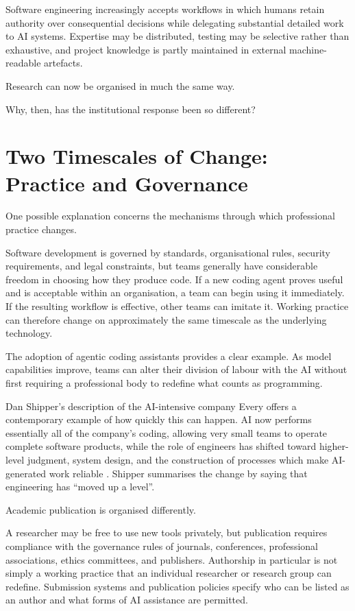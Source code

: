 \documentclass[12pt]{article}
\begin{document}
Software engineering increasingly accepts workflows in which humans retain authority over consequential decisions while delegating substantial detailed work to AI systems. Expertise may be distributed, testing may be selective rather than exhaustive, and project knowledge is partly maintained in external machine-readable artefacts.

Research can now be organised in much the same way.

Why, then, has the institutional response been so different?


\section{Two Timescales of Change: Practice and Governance}

One possible explanation concerns the mechanisms through which professional practice changes.

Software development is governed by standards, organisational rules, security requirements, and legal constraints, but teams generally have considerable freedom in choosing how they produce code. If a new coding agent proves useful and is acceptable within an organisation, a team can begin using it immediately. If the resulting workflow is effective, other teams can imitate it. Working practice can therefore change on approximately the same timescale as the underlying technology.

The adoption of agentic coding assistants provides a clear example. As model capabilities improve, teams can alter their division of labour with the AI without first requiring a professional body to redefine what counts as programming.

Dan Shipper's description of the AI-intensive company Every offers a contemporary example of how quickly this can happen. AI now performs essentially all of the company's coding, allowing very small teams to operate complete software products, while the role of engineers has shifted toward higher-level judgment, system design, and the construction of processes which make AI-generated work reliable \citep{newton2026editorclone}. Shipper summarises the change by saying that engineering has ``moved up a level''.

Academic publication is organised differently.

A researcher may be free to use new tools privately, but publication requires compliance with the governance rules of journals, conferences, professional associations, ethics committees, and publishers. Authorship in particular is not simply a working practice that an individual researcher or research group can redefine. Submission systems and publication policies specify who can be listed as an author and what forms of AI assistance are permitted.
\end{document}
